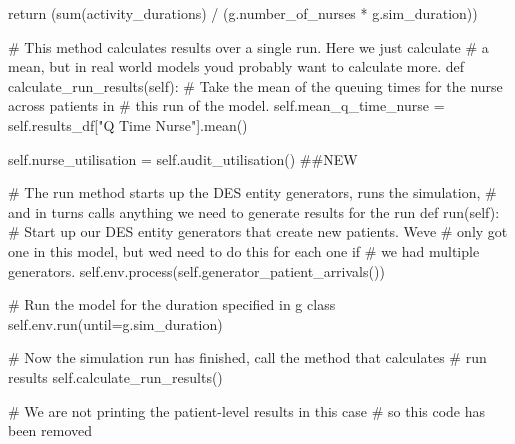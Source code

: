 \documentclass[
  letterpaper,
  DIV=11,
  numbers=noendperiod]{scrreprt}
\newenvironment{Shaded}{\begin{snugshade}}{\end{snugshade}}
\newcommand{\BuiltInTok}[1]{\textcolor[rgb]{0.00,0.23,0.31}{#1}}
\newcommand{\CommentTok}[1]{\textcolor[rgb]{0.37,0.37,0.37}{#1}}
\newcommand{\ControlFlowTok}[1]{\textcolor[rgb]{0.00,0.23,0.31}{#1}}
\newcommand{\KeywordTok}[1]{\textcolor[rgb]{0.00,0.23,0.31}{#1}}
\newcommand{\NormalTok}[1]{\textcolor[rgb]{0.00,0.23,0.31}{#1}}
\newcommand{\OperatorTok}[1]{\textcolor[rgb]{0.37,0.37,0.37}{#1}}
\newcommand{\StringTok}[1]{\textcolor[rgb]{0.13,0.47,0.30}{#1}}
\newcommand{\VariableTok}[1]{\textcolor[rgb]{0.07,0.07,0.07}{#1}}
\begin{document}
\begin{tcolorbox}
\begin{Shaded}
\begin{Highlighting}[]
        \ControlFlowTok{return}\NormalTok{ (}\BuiltInTok{sum}\NormalTok{(activity\_durations) }\OperatorTok{/}\NormalTok{ (g.number\_of\_nurses }\OperatorTok{*}\NormalTok{ g.sim\_duration))}

    \CommentTok{\# This method calculates results over a single run.  Here we just calculate}
    \CommentTok{\# a mean, but in real world models you\textquotesingle{}d probably want to calculate more.}
    \KeywordTok{def}\NormalTok{ calculate\_run\_results(}\VariableTok{self}\NormalTok{):}
        \CommentTok{\# Take the mean of the queuing times for the nurse across patients in}
        \CommentTok{\# this run of the model.}
        \VariableTok{self}\NormalTok{.mean\_q\_time\_nurse }\OperatorTok{=} \VariableTok{self}\NormalTok{.results\_df[}\StringTok{"Q Time Nurse"}\NormalTok{].mean()}

        \VariableTok{self}\NormalTok{.nurse\_utilisation }\OperatorTok{=} \VariableTok{self}\NormalTok{.audit\_utilisation() }\CommentTok{\#\#NEW}


    \CommentTok{\# The run method starts up the DES entity generators, runs the simulation,}
    \CommentTok{\# and in turns calls anything we need to generate results for the run}
    \KeywordTok{def}\NormalTok{ run(}\VariableTok{self}\NormalTok{):}
        \CommentTok{\# Start up our DES entity generators that create new patients.  We\textquotesingle{}ve}
        \CommentTok{\# only got one in this model, but we\textquotesingle{}d need to do this for each one if}
        \CommentTok{\# we had multiple generators.}
        \VariableTok{self}\NormalTok{.env.process(}\VariableTok{self}\NormalTok{.generator\_patient\_arrivals())}

        \CommentTok{\# Run the model for the duration specified in g class}
        \VariableTok{self}\NormalTok{.env.run(until}\OperatorTok{=}\NormalTok{g.sim\_duration)}

        \CommentTok{\# Now the simulation run has finished, call the method that calculates}
        \CommentTok{\# run results}
        \VariableTok{self}\NormalTok{.calculate\_run\_results()}

        \CommentTok{\# We are not printing the patient{-}level results in this case}
        \CommentTok{\# so this code has been removed}


\end{Highlighting}
\end{Shaded}
\end{tcolorbox}
\end{document}

